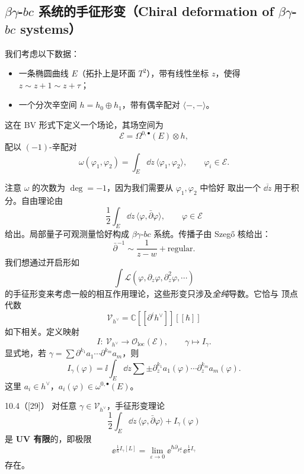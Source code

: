\subsection{$\beta\gamma$-$bc$ 系统的手征形变（Chiral deformation of $\beta\gamma$-$bc$ systems）}

我们考虑以下数据：
\begin{itemize}[leftmargin=1.6em,itemsep=0.2em]
  \item 一条椭圆曲线 $E$（拓扑上是环面 $T^2$），带有线性坐标 $z$，使得
        $z\sim z+1\sim z+\tau$；
  \item 一个分次辛空间 $h=h_0\oplus h_1$，带有偶辛配对 $\langle-,-\rangle$。
\end{itemize}
这在 BV 形式下定义一个场论，其场空间为
\[
  \mathcal{E}=\Omega^{0,\bullet}(E)\otimes h,
\]
配以 $(-1)$-辛配对
\[
  \omega(\varphi_1,\varphi_2)=\int_E\dd z\,\langle\varphi_1,\varphi_2\rangle,
  \qquad \varphi_i\in\mathcal{E}.
\]

注意 $\omega$ 的次数为 $\deg=-1$，因为我们需要从 $\varphi_1,\varphi_2$ 中恰好
取出一个 $\overline{\dd z}$ 用于积分。自由理论由
\[
  \frac{1}{2}\int_E\dd z\,\langle\varphi,\bar\partial\varphi\rangle,
  \qquad \varphi\in\mathcal{E}
\]
给出。局部量子可观测量恰好构成 $\beta\gamma$-$bc$ 系统。传播子由 Szegő 核给出：
\[
  \bar\partial^{-1}\sim\frac{1}{z-w}+\text{regular}.
\]
我们想通过开启形如
\[
  \int\mathcal{L}\left(\varphi,\partial_z\varphi,\partial_z^2\varphi,\cdots\right)
\]
的手征形变来考虑一般的相互作用理论，这些形变只涉及\emph{全纯}导数。它恰与
顶点代数
\[
  \mathcal{V}_{h^\vee}=\mathbb{C}[[\partial^ih^\vee]][[\hbar]]
\]
如下相关。定义映射
\[
  I:\ \mathcal{V}_{h^\vee}\longrightarrow\mathcal{O}_{\mathrm{loc}}(\mathcal{E}),
  \qquad \gamma\mapsto I_\gamma.
\]
显式地，若 $\gamma=\sum\partial^{k_1}a_1\cdots\partial^{k_m}a_m$，则
\[
  I_\gamma(\varphi)
  =\ii\int_E\dd z\sum\pm\partial_z^{k_1}a_1(\varphi)
  \cdots\partial_z^{k_m}a_m(\varphi).
\]
这里 $a_i\in h^\vee$，$a_i(\varphi)\in\omega^{0,\bullet}(E)$。

\begin{wthm}{10.4（[29]）}
  对任意 $\gamma\in\mathcal{V}_{h^\vee}$，手征形变理论
  \[
    \frac{1}{2}\int_E\dd z\,\langle\varphi,\bar\partial\varphi\rangle
    +I_\gamma(\varphi)
  \]
  是 \textbf{UV 有限}的，即极限
  \[
    \ee^{\frac{1}{\hbar}I_\gamma[L]}
    =\lim_{\varepsilon\to0}\ee^{\hbar\partial_{P_\varepsilon^L}}
    \ee^{\frac{1}{\hbar}I_\gamma}
  \]
  存在。
\end{wthm}


